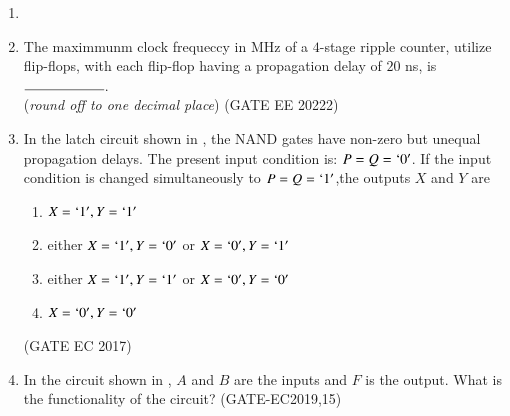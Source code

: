 \begin{enumerate}[label=\arabic*.,ref=\theenumi]
\item 
\item The maximmunm clock frequeccy in MHz of a $4$-stage ripple counter, utilize flip-flops, with each flip-flop having a propagation delay of $20$ ns, is $\rule{2cm}{0.15mm}$.\\
(\textit{round off to one decimal place})
\hfill{(GATE EE 20222)}
%		
\item In the latch circuit shown
in
, the NAND gates have non-zero but unequal propagation delays. The present input condition is: $P=Q=\lq 0\rq$. If the input condition is changed simultaneously to $P=Q=\lq 1\rq$,the outputs $X$ and $Y$ are 
\begin{figure}[H]
\centering
\resizebox{0.75\columnwidth}{!}{%

	}
	\caption{}
\label{figure_1}
\end{figure}
\begin{enumerate}
\item $X=\lq 1\rq,Y=\lq 1 \rq$
\item either $X=\lq 1\rq,Y=\lq 0\rq$ or $X=\lq 0\rq,Y=\lq 1\rq$
\item either $X=\lq 1\rq,Y=\lq 1\rq$ or $X=\lq 0\rq,Y=\lq 0\rq$
\item $X=\lq 0\rq,Y=\lq 0 \rq$
\end{enumerate}
\hfill(GATE EC 2017)
\item In the circuit shown
	   in ,
	$A$ and $B$ are the inputs and $F$ is the output. What is the functionality of the circuit?
           \hfill(GATE-EC2019,15)
           

\end{enumerate}
